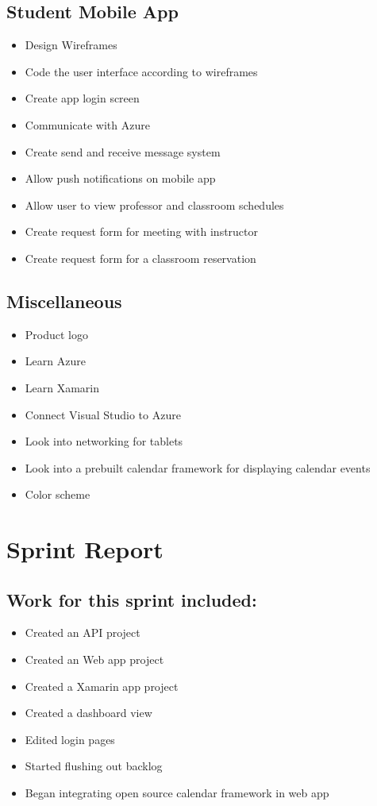 \documentclass{article}
\begin{document}
\subsection*{Student Mobile App}
\begin{itemize}
	\item Design Wireframes
	\item Code the user interface according to wireframes
	\item Create app login screen
	\item Communicate with Azure
	\item Create send and receive message system
	\item Allow push notifications on mobile app
	\item Allow user to view professor and classroom schedules
	\item Create request form for meeting with instructor
	\item Create request form for a classroom reservation 
\end{itemize}

\subsection*{Miscellaneous}
\begin{itemize}
	\item Product logo
	\item Learn Azure
	\item Learn Xamarin
	\item Connect Visual Studio to Azure
	\item Look into networking for tablets
	\item Look into a prebuilt calendar framework for displaying calendar events
	\item Color scheme
\end{itemize}

\pagebreak

\section*{Sprint Report}
\subsection*{Work for this sprint included:}
\begin{itemize}
	\item Created an API project
	\item Created an Web app project
	\item Created a Xamarin app project 
	\item Created a dashboard view
	\item Edited login pages 
	\item Started flushing out backlog
	\item Began integrating open source calendar framework in web app
\end{itemize}
\end{document}
